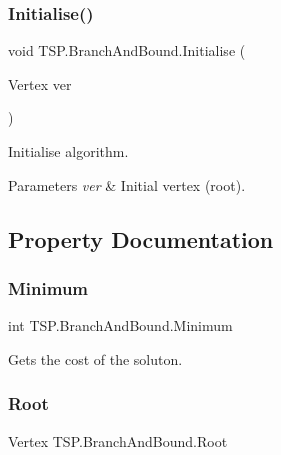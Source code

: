 \subsubsection{\texorpdfstring{Initialise()}{Initialise()}}
{\footnotesize\ttfamily void T\+S\+P.\+Branch\+And\+Bound.\+Initialise (\begin{DoxyParamCaption}\item[{Vertex}]{ver }\end{DoxyParamCaption})\hspace{0.3cm}{\ttfamily [inline]}}



Initialise algorithm. 


\begin{DoxyParams}{Parameters}
{\em ver} & Initial vertex (root).\\
\hline
\end{DoxyParams}


\subsection{Property Documentation}
\mbox{\label{class_t_s_p_1_1_branch_and_bound_abf0f798bc9d1fbcc337d430665cea9d5}} 
\subsubsection{\texorpdfstring{Minimum}{Minimum}}
{\footnotesize\ttfamily int T\+S\+P.\+Branch\+And\+Bound.\+Minimum\hspace{0.3cm}{\ttfamily [get]}}



Gets the cost of the soluton. 

\mbox{\label{class_t_s_p_1_1_branch_and_bound_a6cfacf2e18f7380bd6b0d590a4e4beba}} 
\subsubsection{\texorpdfstring{Root}{Root}}
{\footnotesize\ttfamily Vertex T\+S\+P.\+Branch\+And\+Bound.\+Root\hspace{0.3cm}{\ttfamily [get]}}



